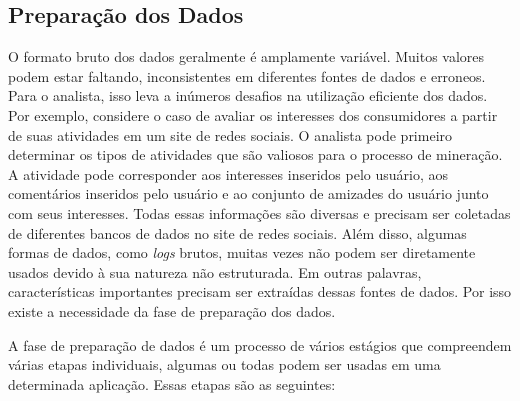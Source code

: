 \subsection{Preparação dos Dados}
O formato bruto dos dados geralmente é amplamente variável. Muitos valores podem estar faltando, inconsistentes em diferentes fontes de dados e erroneos. Para o analista, isso leva a inúmeros desafios na utilização eficiente dos dados. Por exemplo, considere o caso de avaliar os interesses dos consumidores a partir de suas atividades em um site de redes sociais. O analista pode primeiro determinar os tipos de atividades que são valiosos para o processo de mineração. A atividade pode corresponder aos interesses inseridos pelo usuário, aos comentários inseridos pelo usuário e ao conjunto de amizades do usuário junto com seus interesses. Todas essas informações são diversas e precisam ser coletadas de diferentes bancos de dados no site de redes sociais. Além disso, algumas formas de dados, como \textit{logs} brutos, muitas vezes não podem ser diretamente usados devido à sua natureza não estruturada. Em outras palavras, características importantes precisam ser extraídas dessas fontes de dados. Por isso existe a necessidade da fase de preparação dos dados.

A fase de preparação de dados é um processo de vários estágios que compreendem várias etapas individuais, algumas ou todas podem ser usadas em uma determinada aplicação. Essas etapas são as seguintes:


